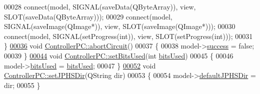 \begin{DoxyCode}
00028     connect(model, SIGNAL(saveData(QByteArray)), view, SLOT(saveData(QByteArray)));
00029     connect(model, SIGNAL(saveImage(QImage*)), view, SLOT(saveImage(QImage*)));
00030     connect(model, SIGNAL(setProgress(\textcolor{keywordtype}{int})), view, SLOT(setProgress(\textcolor{keywordtype}{int})));
00031 \}
\mbox{\hyperlink{class_controller_p_c_a8814989f7be1214e06b2e720889066b0}{00036}} \textcolor{keywordtype}{void} \mbox{\hyperlink{class_controller_p_c_a8814989f7be1214e06b2e720889066b0}{ControllerPC::abortCircuit}}()
00037 \{
00038     model->\mbox{\hyperlink{class_model_p_c_a945ffbbc44a832b953c191debd448f4c}{success}} = \textcolor{keyword}{false};
00039 \}
\mbox{\hyperlink{class_controller_p_c_afd8d33ed84e463c5e0ce6715067003f3}{00044}} \textcolor{keywordtype}{void} \mbox{\hyperlink{class_controller_p_c_afd8d33ed84e463c5e0ce6715067003f3}{ControllerPC::setBitsUsed}}(\textcolor{keywordtype}{int} \mbox{\hyperlink{namespacetests-setup_a64974eb034f518d24195739395783d3d}{bitsUsed}})
00045 \{
00046     model->\mbox{\hyperlink{class_model_p_c_a655deb6a8afa94c7f4aadb3056989038}{bitsUsed}} = \mbox{\hyperlink{namespacetests-setup_a64974eb034f518d24195739395783d3d}{bitsUsed}};
00047 \}
\mbox{\hyperlink{class_controller_p_c_ac00d29685a7e5b780c01eb438e10f96d}{00052}} \textcolor{keywordtype}{void} \mbox{\hyperlink{class_controller_p_c_ac00d29685a7e5b780c01eb438e10f96d}{ControllerPC::setJPHSDir}}(QString dir)
00053 \{
00054     model->\mbox{\hyperlink{class_model_p_c_abd038306f14f22fb885a1697c96d6335}{defaultJPHSDir}} = dir;
00055 \}
\end{DoxyCode}
